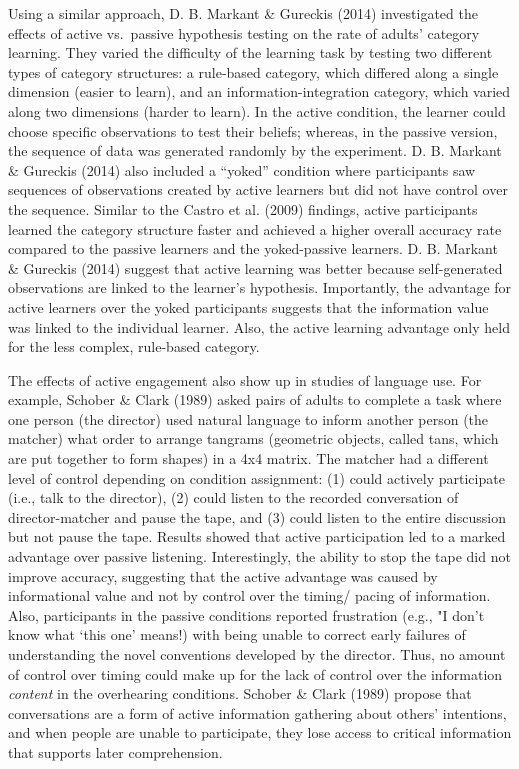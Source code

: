 \documentclass[oneside]{report}
\begin{document}
Using a similar approach, D. B. Markant \& Gureckis (2014) investigated
the effects of active vs.~passive hypothesis testing on the rate of
adults' category learning. They varied the difficulty of the learning
task by testing two different types of category structures: a rule-based
category, which differed along a single dimension (easier to learn), and
an information-integration category, which varied along two dimensions
(harder to learn). In the active condition, the learner could choose
specific observations to test their beliefs; whereas, in the passive
version, the sequence of data was generated randomly by the experiment.
D. B. Markant \& Gureckis (2014) also included a ``yoked'' condition
where participants saw sequences of observations created by active
learners but did not have control over the sequence. Similar to the
Castro et al. (2009) findings, active participants learned the category
structure faster and achieved a higher overall accuracy rate compared to
the passive learners and the yoked-passive learners. D. B. Markant \&
Gureckis (2014) suggest that active learning was better because
self-generated observations are linked to the learner's hypothesis.
Importantly, the advantage for active learners over the yoked
participants suggests that the information value was linked to the
individual learner. Also, the active learning advantage only held for
the less complex, rule-based category.

The effects of active engagement also show up in studies of language
use. For example, Schober \& Clark (1989) asked pairs of adults to
complete a task where one person (the director) used natural language to
inform another person (the matcher) what order to arrange tangrams
(geometric objects, called tans, which are put together to form shapes)
in a 4x4 matrix. The matcher had a different level of control depending
on condition assignment: (1) could actively participate (i.e., talk to
the director), (2) could listen to the recorded conversation of
director-matcher and pause the tape, and (3) could listen to the entire
discussion but not pause the tape. Results showed that active
participation led to a marked advantage over passive listening.
Interestingly, the ability to stop the tape did not improve accuracy,
suggesting that the active advantage was caused by informational value
and not by control over the timing/ pacing of information. Also,
participants in the passive conditions reported frustration (e.g., "I
don't know what `this one' means!) with being unable to correct early
failures of understanding the novel conventions developed by the
director. Thus, no amount of control over timing could make up for the
lack of control over the information \emph{content} in the overhearing
conditions. Schober \& Clark (1989) propose that conversations are a
form of active information gathering about others' intentions, and when
people are unable to participate, they lose access to critical
information that supports later comprehension.
\end{document}
